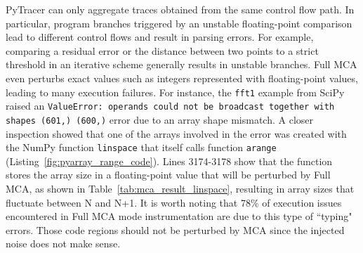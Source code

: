 \documentclass[11pt]{article}
\newcommand{\tristan}[1]{\color{orange}\textbf{From Tristan:} #1\color{black}\xspace}
\newcommand{\gkmod}[2]{\color{purple}\sout{#1} #2\color{black}\xspace}
\newcommand{\Yohan}[1]{\color{green!75!black}\textbf{Yohan:} #1\color{black}\xspace}
\newcommand{\pytracer}[0]{PyTracer\xspace}
\begin{document}
\pytracer can only aggregate traces obtained from the same control flow path. In particular, program branches triggered by an unstable floating-point comparison lead to different control flows and result in parsing errors. 
For example, comparing a residual error or the distance between two points to a strict threshold in an iterative scheme generally results in unstable branches. 
Full MCA even perturbs exact values such as integers represented with floating-point values, leading to many execution failures. For instance, the \texttt{fft1} example from SciPy raised an \texttt{ValueError: operands could not be broadcast together with shapes (601,) (600,)} error due to an array shape mismatch. A closer inspection showed that one of the arrays involved in the error was created with the NumPy function \texttt{linspace} that itself calls function \texttt{arange} (Listing~\ref{fig:pyarray_range_code}). 
Lines 3174-3178 show that the function stores the array size in a floating-point value that will be perturbed by Full MCA, as shown in Table~\ref{tab:mca_result_linspace}, resulting in array sizes that fluctuate between N and N+1.
It is worth noting that 78\% of execution issues encountered in Full MCA mode instrumentation
are due to this type of ``typing" errors.  
Those code regions should not be perturbed by MCA since the injected noise does not make sense.

\end{document}
